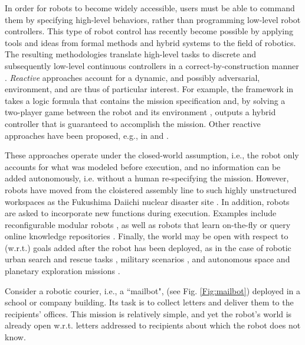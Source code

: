 In order for robots to become widely accessible, users must be able to command them by specifying high-level behaviors, rather than programming low-level robot controllers.
This type of robot control has recently become possible by applying tools and ideas from formal methods and hybrid systems to the field of robotics. The resulting methodologies translate high-level tasks to discrete and subsequently low-level continuous controllers in a correct-by-construction manner \cite{BBEFKP06, KGFP_TRO09, KaramanCDC2009, Wongpiromsarn2010, LaValleRSS2011, BhatiaRAM2011, Belta2013RSS}.
\emph{Reactive} approaches account for a dynamic, and possibly adversarial, environment, and are thus of particular interest. For example, the framework in \cite{KGFP_TRO09} takes a logic formula that contains the mission specification and, by solving a two-player game between the robot and its environment \cite{piterman_06}, outputs a hybrid controller that is guaranteed to accomplish the mission. Other reactive approaches have been proposed, e.g., in \cite{Wongpiromsarn2010} and \cite{Belta2013RSS}.

These approaches operate under the closed-world assumption, i.e., the robot only accounts for what was modeled before execution, and no information can be added autonomously, i.e. without a human re-specifying the mission.
However, robots have moved from the cloistered assembly line to such highly unstructured workspaces as the Fukushima Daiichi nuclear disaster site \cite{Fukushima2011}. 
In addition, robots are asked to incorporate new functions during execution. 
Examples include reconfigurable modular robots \cite{ModularIROS2011}, as well as robots that learn on-the-fly \cite{SaxenaIJRR2012} or query online knowledge repositories \cite{rapyuta2013}. 
Finally, the world may be open with respect to (w.r.t.) goals added after the robot has been deployed, as in the case of robotic urban search and rescue tasks \cite{MatthiasAI2010}, military scenarios \cite{gda2013}, and autonomous space and planetary exploration missions \cite{spaceXplore2006}. 

\begin{myExample}\label{Ex:mailbot1}
Consider a robotic courier, i.e., a ``mailbot", (see Fig. \ref{Fig:mailbot}) deployed in a school or company building. 
Its task is to collect letters and deliver them to the recipients' offices. 
This mission is relatively simple, and yet the robot's world is already open w.r.t. letters addressed to recipients about which the robot does not know. %
\end{myExample}

